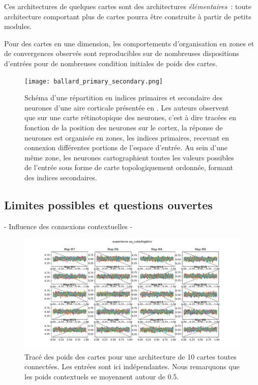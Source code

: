 \documentclass[../main]{subfiles}
\begin{document}
Ces architectures de quelques cartes sont des architectures \emph{élémentaires}~: toute architecture comportant plus de cartes pourra être construite à partir de petits modules.

Pour des cartes en une dimension, les comportements d'organisation en zones et de convergences observés sont reproducibles sur de nombreuses dispositions d'entrées pour de nombreuses condition initiales de poids des cartes.


\begin{figure}
	\centering\texttt{[image: ballard\_primary\_secondary.png]}
	\caption{Schéma d'une répartition en indices primaires et secondaire des neurones d'une aire corticale présentée en \cite{ballard_cortical_1986}. Les auteurs observent que sur une carte rétinotopique des neurones, c'est à dire tracées en fonction de la position des neurones sur le cortex, la réponse de neurones est organisée en zones, les indices primaires, recevant en connexion différentes portions de l'espace d'entrée. Au sein d'une même zone, les neurones cartographient toutes les valeurs possibles de l'entrée sous forme de carte topologiquement ordonnée, formant des indices secondaires.\label{fig:ballard}}
\end{figure}

\subsection{Limites possibles et questions ouvertes}

- Influence des connexions contextuelles 
- 

\begin{figure}
	\includegraphics[width=\textwidth]{xp_cube_bigdim.pdf}
	\caption{Tracé des poids des cartes pour une architecture de 10 cartes toutes connectées. Les entrées sont ici indépendantes. Nous remarquons que les poids contextuels se moyennent autour de 0.5.}
\end{figure}
\end{document}
